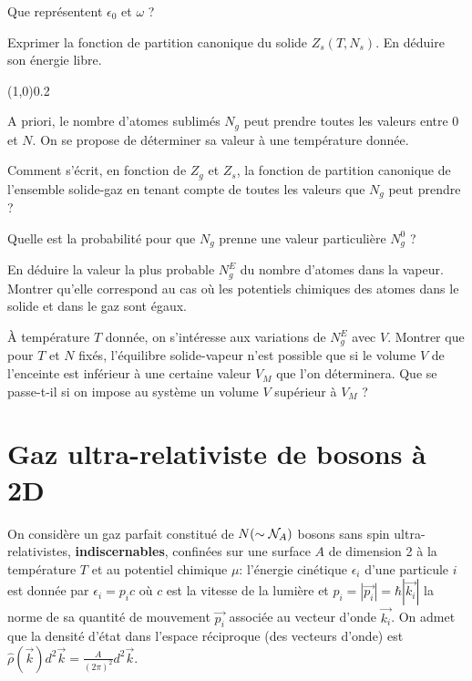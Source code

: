 \documentclass[utf8, 11pt]{feuille}
\begin{document}
\question Que représentent $\epsilon_0$ et $\omega$ ?

\question Exprimer la fonction de partition canonique du solide $Z_s(T, N_s)$. En déduire son énergie libre.

\begin{center} \vspace{-0.5cm}\line(1,0){0.2\textwidth} \vspace{-0.5cm}\end{center}

A priori, le nombre d’atomes sublimés $N_g$ peut prendre toutes les valeurs entre 0 et $N$. On se propose
de déterminer sa valeur à une température donnée.

\medskip

\question Comment s'écrit, en fonction de $Z_g$ et $Z_s$, la fonction de partition canonique de l'ensemble solide-gaz
en tenant compte de toutes les valeurs que $N_g$ peut prendre ?

\question Quelle est la probabilité pour que $N_g$ prenne une valeur particulière $N_g^0$ ?

\question En déduire la valeur la plus probable $N_g^E$ du nombre d'atomes dans la vapeur. Montrer qu'elle
correspond au cas où les potentiels chimiques des atomes dans le solide et dans le gaz sont égaux.

\question \`A température $T$ donnée, on s'intéresse aux variations de $N_g^E$ avec $V$. Montrer que pour $T$ et $N$ fixés, l'équilibre solide-vapeur n'est possible que si le volume $V$ de l’enceinte est inférieur à une certaine
valeur $V_M$ que l'on déterminera. Que se passe-t-il si on impose au système un volume $V$ supérieur à $V_M$ ?


\section{Gaz ultra-relativiste de bosons à 2D}

On considère un gaz parfait constitué de $N (\sim {\cal N}_A)$ bosons sans spin ultra-relativistes, {\bf indiscernables}, confinées sur une surface $A$ de dimension 2 à la température $T$ et au potentiel chimique $\mu$: l'énergie cinétique $\epsilon_i$ d'une particule $i$ est donnée par $\epsilon_i= p_ic$ où $c$ est la vitesse de la lumière et $p_i=|\Vec{p_i}|=\hbar |\Vec{k_i}|$ la norme de sa quantité de mouvement $\Vec{p_i}$ associée au vecteur d'onde $\Vec{k_i}$. On admet que la densité d'état dans l'espace réciproque (des vecteurs d'onde) est $\hat{\rho}(\Vec{k})d^2 \Vec{k}= \frac{A}{(2 \pi)^2} d^2 \Vec{k}$.
\end{document}
